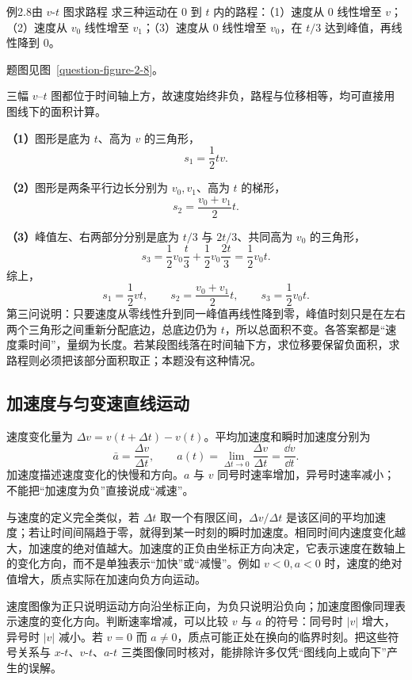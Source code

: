 \begin{origexamplebox}{例2.8\quad 由 $v$-$t$ 图求路程}
求三种运动在 $0$ 到 $t$ 内的路程：（1）速度从 $0$ 线性增至 $v$；（2）速度从 $v_0$ 线性增至 $v_1$；（3）速度从 $0$ 线性增至 $v_0$，在 $t/3$ 达到峰值，再线性降到 $0$。
\par 题图见图~\ref{question-figure-2-8}。
\KQuestionAI
\end{origexamplebox}
\begin{xesolution}
三幅 $v$--$t$ 图都位于时间轴上方，故速度始终非负，路程与位移相等，均可直接用图线下的面积计算。


\ExampleTwoEightGraphs
\textbf{（1）}图形是底为 $t$、高为 $v$ 的三角形，
\[
 s_1=\frac12tv.
\]

\textbf{（2）}图形是两条平行边长分别为 $v_0,v_1$、高为 $t$ 的梯形，
\[
 s_2=\frac{v_0+v_1}{2}t.
\]

\textbf{（3）}峰值左、右两部分分别是底为 $t/3$ 与 $2t/3$、共同高为 $v_0$ 的三角形，
\[
 s_3=\frac12v_0\frac t3+\frac12v_0\frac{2t}{3}
 =\frac12v_0t.
\]
综上，
\[
  \boxed{s_1=\frac12vt},\qquad
  \boxed{s_2=\frac{v_0+v_1}{2}t},\qquad
  \boxed{s_3=\frac12v_0t}.
\]
第三问说明：只要速度从零线性升到同一峰值再线性降到零，峰值时刻只是在左右两个三角形之间重新分配底边，总底边仍为 $t$，所以总面积不变。各答案都是“速度乘时间”，量纲为长度。若某段图线落在时间轴下方，求位移要保留负面积，求路程则必须把该部分面积取正；本题没有这种情况。
\end{xesolution}

\subsection{加速度与匀变速直线运动}

速度变化量为 $\Delta v=v(t+\Delta t)-v(t)$。平均加速度和瞬时加速度分别为
\begin{equation}
  \bar a=\frac{\Delta v}{\Delta t},\qquad
  a(t)=\lim_{\Delta t\to0}\frac{\Delta v}{\Delta t}=\frac{\dd v}{\dd t}.
\end{equation}
加速度描述速度变化的快慢和方向。$a$ 与 $v$ 同号时速率增加，异号时速率减小；不能把“加速度为负”直接说成“减速”。

与速度的定义完全类似，若 $\Delta t$ 取一个有限区间，$\Delta v/\Delta t$ 是该区间的平均加速度；若让时间间隔趋于零，就得到某一时刻的瞬时加速度。相同时间内速度变化越大，加速度的绝对值越大。加速度的正负由坐标正方向决定，它表示速度在数轴上的变化方向，而不是单独表示“加快”或“减慢”。例如 $v<0,a<0$ 时，速度的绝对值增大，质点实际在加速向负方向运动。

速度图像为正只说明运动方向沿坐标正向，为负只说明沿负向；加速度图像同理表示速度的变化方向。判断速率增减，可以比较 $v$ 与 $a$ 的符号：同号时 $|v|$ 增大，异号时 $|v|$ 减小。若 $v=0$ 而 $a\ne0$，质点可能正处在换向的临界时刻。把这些符号关系与 $x$-$t$、$v$-$t$、$a$-$t$ 三类图像同时核对，能排除许多仅凭“图线向上或向下”产生的误解。


